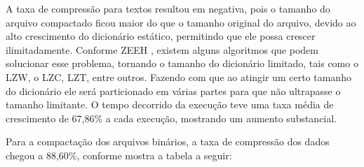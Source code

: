 \documentclass[
	article,			
	11pt,				
	oneside,			
	a4paper,			
	english,			
	brazil,				
	sumario=tradicional
	]{abntex2}
\begin{document}
\begin{table}[h!]
  \begin{center}
    \label{tab:table4}
    \caption{Taxa de compressão e tempo de execução para arquivos ASCII.}
  \end{center}
\end{table}
A taxa de compressão para textos resultou em negativa, pois o tamanho do arquivo compactado ficou maior do que o tamanho original do arquivo, devido ao alto crescimento do dicionário estático, permitindo que ele possa crescer ilimitadamente. Conforme ZEEH \cite{christinazeeh2013}, existem alguns algoritmos que podem solucionar esse problema, tornando o tamanho do dicionário limitado, tais como o LZW, o LZC, LZT, entre outros. Fazendo com que ao atingir um certo tamanho do dicionário ele será particionado em várias partes para que não ultrapasse o tamanho limitante. O tempo decorrido da execução teve uma taxa média de crescimento de 67,86\% a cada execução, mostrando um aumento substancial. 

Para a compactação dos arquivos binários, a taxa de compressão dos dados chegou a 88,60\%, conforme mostra a tabela a seguir:
\end{document}
